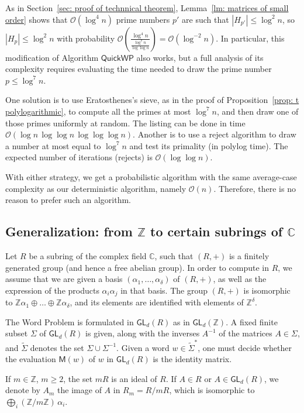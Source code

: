 \documentclass{article}
\def\alph{\tilde{\Sigma}}
\def\O{\mathcal{O}}
\def\C{\mathbb{C}}
\def\Z{\mathbb{Z}}
\def\GL{\textsf{GL}}
\def\S{\textsf{QuickWP}}
\def\mat{\textsf{M}}
\def\inv{^{-1}}
\theoremstyle{plain}
\theoremstyle{definition}
\begin{document}
As in Section~\ref{sec: proof of technnical theorem}, Lemma~\ref{lm: matrices of small order} shows that $\O(\log^4n)$ prime numbers $p'$ are such that $|H_{p'}| \le \log^2n$, so $|H_{p}| \le \log^2n$ with probability $\O\left(\frac{\log^4n}{\frac{\log^7n}{\log\log n}}\right) = \O(\log^{-2}n)$. In particular, this modification of Algorithm $\S$ also works, but a full analysis of its complexity requires evaluating the time needed to draw the prime number $p \le \log^7n$.

One solution is to use Eratosthenes's sieve, as in the proof of Proposition~\ref{prop: t polylogarithmic}, to compute all the primes at most $\log^7n$, and then draw one of those primes uniformly at random. The listing can be done in time $\O(\log n\,\log\log n\, \log\log\log n)$. Another is to use a reject algorithm to draw a number at most equal to $\log^7n$ and test its primality (in polylog time). The expected number of iterations (rejects) is $\O(\log\log n)$.

With either strategy, we get a probabilistic algorithm with the same average-case complexity as our deterministic algorithm, namely $\O(n)$. Therefore, there is no reason to prefer such an algorithm. 


\subsection{Generalization: from $\Z$ to certain subrings of $\C$}\label{sec: generalization}

Let $R$ be a subring of the complex field $\C$, such that $(R,+)$ is a finitely generated group (and hence a free abelian group). In order to compute in $R$, we assume that we are given a basis $(\alpha_1,\dots,\alpha_\delta)$ of $(R,+)$, as well as the expression of the products $\alpha_i\alpha_j$ in that basis. The group $(R,+)$ is isomorphic to $\Z\alpha_1 \oplus \dots \oplus \Z\alpha_\delta$, and its elements are identified with elements of $\Z^\delta$.

The Word Problem is formulated in $\GL_d(R)$ as in $\GL_d(\Z)$.
A fixed finite subset $\Sigma$ of $\GL_d(R)$ is given, along with the inverses $A\inv$ of the matrices $A\in \Sigma$, and $\alph$ denotes the set $\Sigma \cup \Sigma\inv$. Given a word $w\in \alph^*$, one must decide whether the evaluation $\mat(w)$ of $w$ in $\GL_d(R)$ is the identity matrix.

If $m\in \Z$, $m \ge 2$, the set $mR$ is an ideal of $R$. If $A\in R$ or $A \in \GL_d(R)$, we denote by $A_m$ the image of $A$ in $R_m = R/mR$, which is isomorphic to $\bigoplus_i (\Z/m\Z)\, \alpha_i$.
\end{document}
